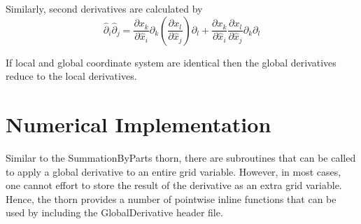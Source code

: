 \documentclass{article}
\begin{document}
Similarly, second derivatives are calculated by
\begin{equation}
\hat\partial_i\hat\partial_j = \frac{\partial x_k}{\partial \hat{x}_i} \partial_k \left( \frac{\partial x_l}{\partial \hat{x}_j} \right) \partial_l + \frac{\partial x_k}{\partial \hat{x}_i} \frac{\partial x_l}{\partial \hat{x}_j} \partial_k \partial_l
\end{equation}


If local and global coordinate system are identical then the global derivatives reduce
to the local derivatives.


\section{Numerical Implementation}

Similar to the SummationByParts thorn, there are subroutines that can be called to apply a global derivative to an entire grid variable.
However, in most cases, one cannot effort to store the result of the derivative as an extra grid variable. 
Hence, the thorn provides a number of pointwise inline functions that can be used by including the GlobalDerivative header file.
 
\end{document}
